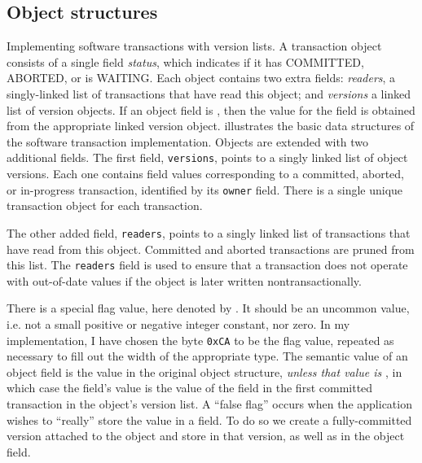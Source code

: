 \subsection{Object structures}%
%
 {Implementing software transactions with version
  lists.  A transaction object consists of a single field {\it
    status}, which indicates if it has COMMITTED, ABORTED, or is WAITING\@.
  Each object contains two extra fields: {\it readers}, a
  singly-linked list of transactions that have read this object; and
  {\it versions} a linked list of version objects.  If an object field
  is \FLAG, then the value for the field is obtained from the
  appropriate linked version object.}
 illustrates the basic data structures of the \apex
software transaction implementation.  Objects are extended with two
additional fields.  The first field, {\tt versions}, points to a
singly linked list of object versions.  Each one contains field values
corresponding to a committed, aborted, or in-progress transaction,
identified by its {\tt owner} field.  There is a single unique
transaction object for each transaction.

The other added field, {\tt readers}, points to a singly linked list
of transactions that have read from this object.  Committed and
aborted transactions are pruned from this list.  The {\tt readers}
field is used to ensure that a transaction does not operate with
out-of-date values if the object is later written
nontransactionally.

There is a special flag value, here denoted by \FLAG\@.  It should be
an uncommon value, i.e. not a small positive or negative integer
constant, nor zero.  In my implementation, I have chosen the byte
\texttt{0xCA} to be the flag value, repeated as necessary to fill out
the width of the appropriate type.
The semantic value of an object field is the value in the original
object structure, \emph{unless that value is \FLAG}, in which
case the field's value is the value of the field in the first
committed transaction in the object's version list.  A ``false flag''
occurs when the application wishes to ``really'' store the value \FLAG
in a field. To do so we create a fully-committed version
attached to the object and store \FLAG in that version, as well as in
the object field.\label{pg:falseflag}

